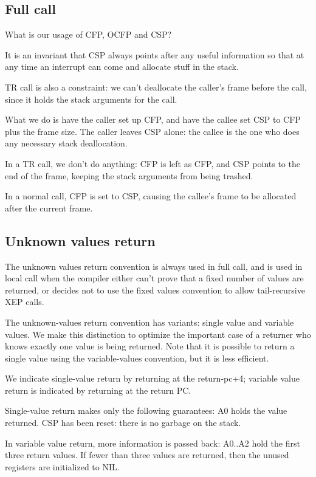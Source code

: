 \subsection{Full call}

What is our usage of CFP, OCFP and CSP?  

It is an invariant that CSP always points after any useful information so that
at any time an interrupt can come and allocate stuff in the stack.

TR call is also a constraint: we can't deallocate the caller's frame before the
call, since it holds the stack arguments for the call.  

What we do is have the caller set up CFP, and have the callee set CSP to CFP
plus the frame size.  The caller leaves CSP alone: the callee is the one who
does any necessary stack deallocation.

In a TR call, we don't do anything: CFP is left as CFP, and CSP points to the
end of the frame, keeping the stack arguments from being trashed.

In a normal call, CFP is set to CSP, causing the callee's frame to be allocated
after the current frame.

\subsection{Unknown values return}

The unknown values return convention is always used in full call, and is used
in local call when the compiler either can't prove that a fixed number of
values are returned, or decides not to use the fixed values convention to allow
tail-recursive XEP calls.

The unknown-values return convention has variants: single value and variable
values.  We make this distinction to optimize the important case of a returner
who knows exactly one value is being returned.  Note that it is possible to
return a single value using the variable-values convention, but it is less
efficient.

We indicate single-value return by returning at the return-pc+4; variable value
return is indicated by returning at the return PC.

Single-value return makes only the following guarantees:
    A0 holds the value returned.
    CSP has been reset: there is no garbage on the stack.

In variable value return, more information is passed back:
    A0..A2 hold the first three return values.  If fewer than three values are
    returned, then the unused registers are initialized to NIL.

